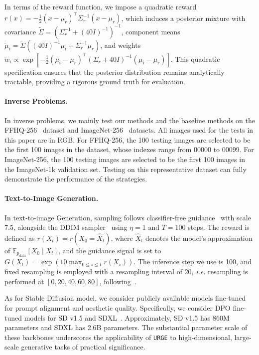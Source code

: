 \documentclass{article}
\theoremstyle{plain}
\theoremstyle{definition}
\theoremstyle{remark}
\begin{document}
In terms of the reward function, we impose a quadratic reward \(r(x)=-\tfrac12(x-\mu_r)^{\top}\Sigma_r^{-1}(x-\mu_r)\), which induces a posterior mixture with covariance \(\widetilde{\Sigma}=(\Sigma_r^{-1}+(40I)^{-1})^{-1}\), component means \(\widetilde{\mu}_i=\widetilde{\Sigma}((40I)^{-1}\mu_i+\Sigma_r^{-1}\mu_r)\), and weights \(\widetilde{w}_i\propto \exp\left[-\tfrac12(\mu_i-\mu_r)^{\top}(\Sigma_r+40I)^{-1}(\mu_i-\mu_r)\right]\). This quadratic specification ensures that the posterior distribution remains analytically tractable, providing a rigorous ground truth for evaluation.

\paragraph{Inverse Problems.} In inverse problems, we mainly test our methods and the baseline methods on the FFHQ-256~\cite{tero2019ffhq} dataset and ImageNet-256~\cite{jia2009imagenet} datasets. All images used for the tests in this paper are in RGB. For FFHQ-256, the 100 testing images are selected to be the first 100 images in the dataset, whose indexes range from 00000 to 00099. For ImageNet-256, the 100 testing images are selected to be the first 100 images in the ImageNet-1k validation set. Testing on this representative dataset can fully demonstrate the performance of the strategies.


\paragraph{Text-to-Image Generation.}In text-to-image Generation, sampling follows classifier-free guidance~\cite{ho2022classifierfree} with scale 7.5, alongside the DDIM sampler~\cite{SongMengErmon2021_DDIM} using \(\eta=1\) and \(T=100\) steps. The reward is defined as \(r(X_t)=r(X_0=\widehat X_t)\), where \(\widehat X_t\) denotes the model's approximation of \(\mathbb{E}_{p_{\mathrm{data}}}[X_0\mid X_t]\), and the guidance signal is set to \(G(X_t)=\exp\left(10\max_{0\le s\le t} r(X_s)\right)\). The inference step we use is 100, and fixed resampling is employed with a resampling interval of 20, \emph{i.e.} resampling is performed at $[0,20,40,60,80]$, following~\cite{singhal2025general}.

As for Stable Diffusion model, we consider publicly available models fine-tuned for prompt alignment and aesthetic quality. Specifically, we consider DPO fine-tuned models for SD v1.5 and SDXL~\cite{wallace2024dpo, rafailov2023dpo}. Approximately, SD v1.5 has 860M parameters and SDXL has 2.6B parameters. The substantial parameter scale of these backbones underscores the applicability of \texttt{URGE} to high-dimensional, large-scale generative tasks of practical significance.
\end{document}
